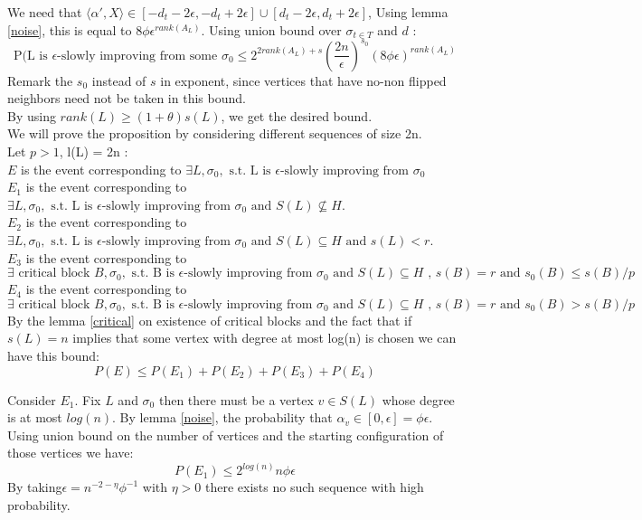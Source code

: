 \documentclass[12pt]{article}
\begin{document}
We need that $ \langle\alpha ', X \rangle \in [- d_t -2\epsilon, -d_t + 2\epsilon] \cup [d_t - 2\epsilon, d_t + 2\epsilon]$, Using lemma \ref{noise}, this is equal to $8\phi\epsilon^{rank(A_L)}$. Using union bound over $\sigma_{t \in T}$ and $d$ :
\begin{equation*}
\text{P(L is }\epsilon\text{-slowly improving from some }\sigma_0 \leq 2^{2rank(A_L) + s}(\frac{2n}{\epsilon})^{s_0}(8\phi\epsilon)^{rank(A_L)}
\end{equation*}
Remark the $s_0$ instead of $s$ in exponent, since vertices that have no-non flipped neighbors need not be taken in this bound. \\
By using  $rank(L) \geq (1+\theta)s(L)$, we get the desired bound. \\

We will prove the proposition by considering different sequences of size 2n.\\
Let $ p > 1$, l(L) = 2n : \\
$E$ is the event corresponding to $\exists L, \sigma_0, \text{ s.t. L is }\epsilon\text{-slowly improving from }\sigma_0 $\\
$E_1$ is the event corresponding to $\exists L, \sigma_0, \text{ s.t. L is }\epsilon\text{-slowly improving from }\sigma_0 \text{ and }S(L) \not\subseteq H$.\\
$E_2$ is the event corresponding to $\exists L, \sigma_0,\text{ s.t. L is }\epsilon\text{-slowly improving from }\sigma_0\text{ and }S(L) \subseteq H\text{ and }s(L) < r$. \\
$E_3$   is the event corresponding to $\exists \text{ critical block } B, \sigma_0,\text{ s.t. B is }\epsilon\text{-slowly improving from }\sigma_0\text{ and }S(L) \subseteq H \text{ , } s(B) = r \text{ and } s_0(B) \leq s(B) / p$ \\
$E_4$   is the event corresponding to $\exists \text{ critical block } B, \sigma_0,\text{ s.t. B is }\epsilon\text{-slowly improving from }\sigma_0\text{ and }S(L) \subseteq H \text{ , } s(B) = r \text{ and } s_0(B) > s(B) / p$ \\
By the lemma \ref{critical} on existence of critical blocks and the fact that if $s(L) = n$ implies that some vertex with degree at most log(n) is chosen we can have this bound:
\begin{equation*}
P(E) \leq P(E_1) + P(E_2) + P(E_3) + P(E_4)
\end{equation*}


Consider $E_1$. Fix $L$ and $\sigma_0$ then there must be a vertex $v \in S(L)$ whose degree is at most $log(n)$. By lemma  \ref{noise}, the probability that $\alpha_v \in [0, \epsilon] = \phi \epsilon$. Using union bound on the number of vertices and the starting configuration of those vertices we have:
\begin{equation}
P(E_1)  \leq 2^{log(n)}n \phi \epsilon
\end{equation}
By taking$\epsilon = n^{-2 - \eta} \phi^{-1}$ with $\eta > 0$ there exists no such sequence with high probability. \\
\end{document}
